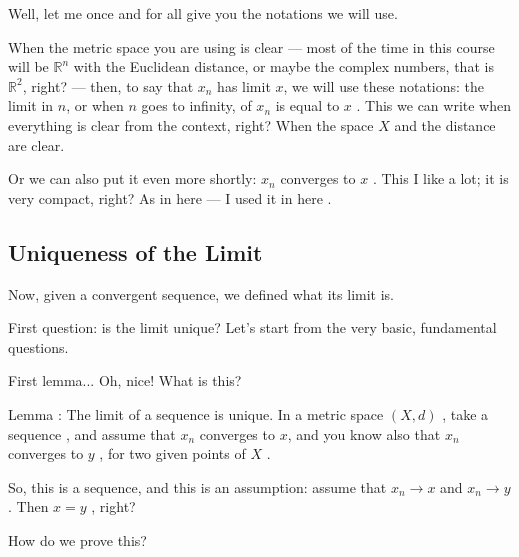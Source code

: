 \begin{speech}[00:06:22 - 00:07:35]
Well, let me once and for all give you the notations we will use. 

When the metric space you are using is clear --- most of the time in this course will be $\mathbb{R}^n$ with the Euclidean distance, or maybe the complex numbers, that is $\mathbb{R}^2$, right? --- then, to say that $x_n$ has limit $x$, we will use these notations: the limit in $n$, or when $n$ goes to infinity, of $x_n$ is equal to $x$ . This we can write when everything is clear from the context, right? When the space $X$ and the distance are clear.

Or we can also put it even more shortly: $x_n$ converges to $x$ . This I like a lot; it is very compact, right? As in here --- I used it in here .
\end{speech}

\begin{content}
\end{content}

\subsection{Uniqueness of the Limit}

\begin{speech}[00:07:35 - 00:09:20]
Now, given a convergent sequence, we defined what its limit is.

First question: is the limit unique? Let's start from the very basic, fundamental questions.

First lemma...  Oh, nice! What is this? 

Lemma : The limit of a sequence is unique. In a metric space $(X, d)$ , take a sequence , and assume that $x_n$ converges to $x$, and you know also that $x_n$ converges to $y$ , for two given points of $X$ .

So, this is a sequence, and this is an assumption: assume that $x_n \to x$ and $x_n \to y$. Then $x = y$ , right? 

How do we prove this?
\end{speech}

